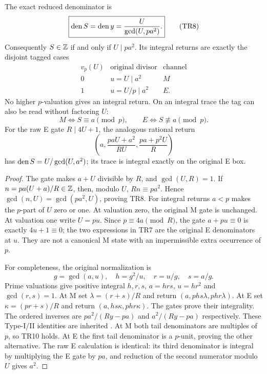 \begin{theorem}\label{thm:raw}
The exact reduced denominator is
\[
 \boxed{\operatorname{den} S=\operatorname{den} y=\frac{U}{\gcd(U,pa^2)}.}           \tag{TR8}
\]
Consequently $S\in\mathbb Z$ if and only if $U\mid pa^2$. Its integral returns are
exactly the disjoint tagged cases
\[
 \begin{array}{c|c|c}
 v_p(U)&\text{original divisor}&\text{channel}\\\hline
 0&u=U\mid a^2&M\\
 1&u=U/p\mid a^2&E.
 \end{array}                                           \tag{TR9}
\]
No higher $p$-valuation gives an integral return. On an integral trace the tag
can also be read without factoring $U$:
\[
 \boxed{M\iff S\equiv a\pmod p,\qquad E\iff S\not\equiv a\pmod p.}
                                                               \tag{TR10}
\]
For the raw E gate $R\mid4U+1$, the analogous rational return
\[
 \left(a,\frac{paU+a^2}{RU},\frac{pa+p^2U}{R}\right)
\]
has $\operatorname{den} S=U/\gcd(U,a^2)$; its trace is integral exactly on the original E box.
\end{theorem}
\begin{proof}
The gate makes $a+U$ divisible by $R$, and $\gcd(U,R)=1$. If
$n=pa(U+a)/R\in\mathbb Z$, then, modulo $U$,
$Rn\equiv pa^2$. Hence $\gcd(n,U)=\gcd(pa^2,U)$, proving TR8. For integral
returns $a<p$ makes the $p$-part of $U$ zero or one. At valuation zero, the
original M gate is unchanged. At valuation one write $U=pu$. Since
$p\equiv4a\pmod R$, the gate $a+pu\equiv0$ is exactly $4u+1\equiv0$; the two
expressions in TR7 are the original E denominators at $u$. They are not a
canonical M state with an impermissible extra occurrence of $p$.

For completeness, the original normalization is
\[
 g=\gcd(a,u),\quad h=g^2/u,\quad r=u/g,\quad s=a/g.
\]
Prime valuations give positive integral $h,r,s$, $a=hrs$, $u=hr^2$ and
$\gcd(r,s)=1$. At M set $\lambda=(r+s)/R$ and return
$(a,phs\lambda,phr\lambda)$. At E set $\kappa=(pr+s)/R$ and return
$(a,hs\kappa,phr\kappa)$. The gates prove their integrality. The ordered
inverses are $pa^2/(Ry-pa)$ and $a^2/(Ry-pa)$ respectively. These Type-I/II
identities are inherited \cite[\S2, Propositions 2.2 and 2.6]{ET}.
At M both tail denominators are multiples of $p$, so TR10 holds. At E the first
tail denominator is a $p$-unit, proving the other alternative. The raw E
calculation is identical: its third denominator is integral by multiplying the
E gate by $pa$, and reduction of the second numerator modulo $U$ gives $a^2$.
\end{proof}

